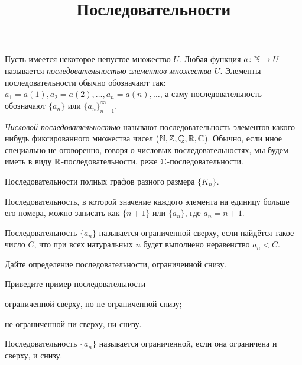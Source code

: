 \documentclass[a4paper, 12pt, num=24]{listok}
\begin{document}
\title{Последовательности}
\maketitle{}
\begin{definition}
	Пусть имеется некоторое непустое множество $U$.
	Любая функция $a \colon \mathbb{N} \to U$ называется \textit{последовательностью элементов множества $U$}.
	Элементы последовательности обычно обозначают так: $a_1 = a(1), a_2 = a(2), \ldots, a_n = a(n), \ldots$,
	а саму последовательность обозначают $\{a_n\}$ или ${\{a_n\}}_{n = 1}^{\infty}$.
\end{definition}
\begin{definition}
	\textit{Числовой последовательностью} называют последовательность элементов какого-нибудь фиксированного множества чисел ($\mathbb{N}, \mathbb{Z}, \mathbb{Q}, \mathbb{R}, \mathbb{C}$).
	Обычно, если иное специально не оговоренно, говоря о числовых последовательностях, мы будем иметь в виду $\mathbb{R}$-последовательности, реже $\mathbb{C}$-последовательности.
\end{definition}
\begin{example}
	Последовательности полных графов разного размера $\{K_n\}$.
\end{example}
\begin{example}
	Последовательность, в которой значение каждого элемента на единицу больше его номера,
	можно записать как $\{n + 1\}$ или $\{a_n\}$, где $a_n = n + 1$.
\end{example}
\begin{definition}
	Последовательность $\{a_n\}$ называется ограниченной сверху, если найдётся такое число $C$,
	что при всех натуральных $n$ будет выполнено неравенство $a_n < C$.
\end{definition}
\begin{problem}
	Дайте определение последовательности, ограниченной снизу.
\end{problem}
\begin{problem}
	Приведите пример последовательности 
	\begin{probparts}
		\item ограниченной сверху, но не ограниченной снизу;
		\item не ограниченной ни сверху, ни снизу.
	\end{probparts}
\end{problem}
\begin{definition}
	Последовательность $\{a_n\}$ называется ограниченной, если она ограничена и сверху, и снизу.
\end{definition}
\end{document}
